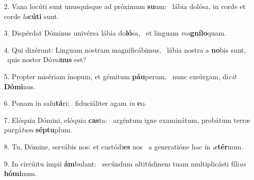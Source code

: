 2. Vana locúti sunt unusquísque ad próximum \textbf{su}um: \ast\  lábia dolósa, in corde et corde \textit{lo}\textbf{cú}\textbf{ti} sunt.\

3. Dispérdat Dóminus univérsa lábia do\textbf{ló}sa, \ast\  et linguam \textit{ma}\textbf{gní}\textbf{lo}quam.\

4. Qui dixérunt: Linguam nostram magnificábimus, \dag\  lábia nostra a \textbf{no}bis sunt, \ast\  quis noster Dó\textit{mi}\textbf{nus} est?\

5. Propter misériam ínopum, et gémitum \textbf{páu}perum, \ast\  nunc exsúrgam, di\textit{cit} \textbf{Dó}\textbf{mi}nus.\

6. Ponam in salu\textbf{tá}ri: \ast\  fiduciáliter agam \textit{in} \textbf{e}o.\

7. Elóquia Dómini, elóquia \textbf{cas}ta: \ast\  argéntum igne examinátum, probátum terræ purgá\textit{tum} \textbf{sép}\textbf{tu}plum.\

8. Tu, Dómine, servábis nos: et custódi\textbf{es} nos \ast\  a generatióne hac in \textit{æ}\textbf{tér}num.\

9. In circúitu ímpii \textbf{ám}bulant: \ast\  secúndum altitúdinem tuam multiplicásti fíli\textit{os} \textbf{hó}\textbf{mi}num.\

